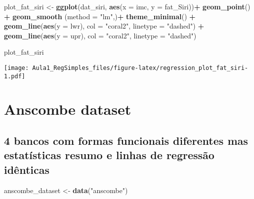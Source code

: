 \documentclass[]{article}
\newenvironment{Shaded}{\begin{snugshade}}{\end{snugshade}}
\newcommand{\DataTypeTok}[1]{\textcolor[rgb]{0.13,0.29,0.53}{#1}}
\newcommand{\KeywordTok}[1]{\textcolor[rgb]{0.13,0.29,0.53}{\textbf{#1}}}
\newcommand{\NormalTok}[1]{#1}
\newcommand{\OperatorTok}[1]{\textcolor[rgb]{0.81,0.36,0.00}{\textbf{#1}}}
\newcommand{\StringTok}[1]{\textcolor[rgb]{0.31,0.60,0.02}{#1}}
\begin{document}
\begin{Shaded}
\begin{Highlighting}[]
\NormalTok{plot_fat_siri <-}\StringTok{ }\KeywordTok{ggplot}\NormalTok{(dat_siri, }\KeywordTok{aes}\NormalTok{(}\DataTypeTok{x =}\NormalTok{ imc, }\DataTypeTok{y =}\NormalTok{ fat_Siri))}\OperatorTok{+}
\StringTok{  }\KeywordTok{geom_point}\NormalTok{() }\OperatorTok{+}\StringTok{ }
\StringTok{  }\KeywordTok{geom_smooth}\NormalTok{ (}\DataTypeTok{method =} \StringTok{"lm"}\NormalTok{,)}\OperatorTok{+}
\StringTok{  }\KeywordTok{theme_minimal}\NormalTok{() }\OperatorTok{+}
\StringTok{  }\KeywordTok{geom_line}\NormalTok{(}\KeywordTok{aes}\NormalTok{(}\DataTypeTok{y =}\NormalTok{ lwr), }\DataTypeTok{col =} \StringTok{"coral2"}\NormalTok{, }\DataTypeTok{linetype =} \StringTok{"dashed"}\NormalTok{) }\OperatorTok{+}\StringTok{   }\KeywordTok{geom_line}\NormalTok{(}\KeywordTok{aes}\NormalTok{(}\DataTypeTok{y =}\NormalTok{ upr), }\DataTypeTok{col =} \StringTok{"coral2"}\NormalTok{, }\DataTypeTok{linetype =} \StringTok{"dashed"}\NormalTok{)}

\NormalTok{plot_fat_siri}
\end{Highlighting}
\end{Shaded}

\texttt{[image: Aula1\_RegSimples\_files/figure-latex/regression\_plot\_fat\_siri-1.pdf]}

\hypertarget{anscombe-dataset}{%
\section{Anscombe dataset}\label{anscombe-dataset}}

\hypertarget{bancos-com-formas-funcionais-diferentes-mas-estatisticas-resumo-e-linhas-de-regressao-identicas}{%
\subsection{4 bancos com formas funcionais diferentes mas estatísticas
resumo e linhas de regressão
idênticas}\label{bancos-com-formas-funcionais-diferentes-mas-estatisticas-resumo-e-linhas-de-regressao-identicas}}

\begin{Shaded}
\begin{Highlighting}[]
\NormalTok{anscombe_dataset <-}\StringTok{ }\KeywordTok{data}\NormalTok{(}\StringTok{"anscombe"}\NormalTok{)}
\end{Highlighting}
\end{Shaded}
\end{document}

